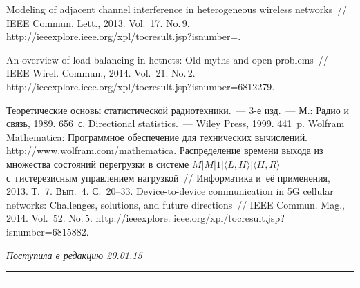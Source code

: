 \begin{multicols}{2}
{{\begin{thebibliography}{99}
 Modeling of adjacent channel interference in
heterogeneous wireless networks~// IEEE Commun. Lett., 2013. Vol.~17. No.\,9. {\sf
http://ieeexplore.ieee.org/xpl/tocresult.jsp?isnumber=}.

 An overview of load balancing in
hetnets: Old myths and open problems~// IEEE Wirel. Commun., 2014. Vol.~21. No.\,2.
{\sf http://ieeexplore.ieee.org/xpl/tocresult.\linebreak jsp?isnumber=6812279}.


 Теоретические основы статистической радиотехники.~--- 3-е изд.~--- М.:
Радио и связь, 1989. 656~с.
 Directional statistics.~--- Wiley Press, 1999. 441~p.
Wolfram Mathematica: Программное обеспечение для технических вычислений. {\sf
http://www.wolfram.\linebreak com/mathematica}.
 Распределение времени выхода из множества
состояний перегрузки в системе $M\vert M\vert 1\vert \langle L,H\rangle \vert \langle
H,R\rangle$ с~гистерезисным управлением нагрузкой~// Информатика и~её применения,
2013. Т.~7. Вып.~4. С.~20--33.
 Device-to-device communication in 5G cellular
networks: Challenges, solutions, and future directions~// IEEE Commun. Mag., 2014.
Vol.~52. No.\,5. {\sf http://ieeexplore. ieee.org/xpl/tocresult.jsp?isnumber=6815882}.
 \end{thebibliography}

 }
 }

\end{multicols}

\vspace*{-3pt}

\hfill{\small\textit{Поступила в редакцию 20.01.15}}


\vspace*{12pt}

\hrule

\vspace*{2pt}

\hrule


